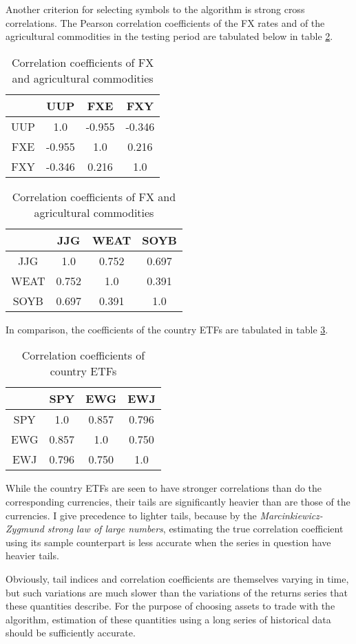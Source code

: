 \documentclass[12pt]{article}
\begin{document}
Another criterion for selecting symbols to the algorithm is strong
cross correlations. The Pearson correlation coefficients of the
FX rates and of the agricultural commodities in the testing period are
tabulated below in table \ref{tab:cor1}.
\begin{table}[htb!]
  \begin{minipage}[t]{0.5\linewidth}
    \centering
    \begin{tabular}{c|c|c|c}
      & UUP & FXE & FXY \\
      \hline
      UUP & 1.0 & -0.955 & -0.346 \\
      FXE & -0.955 & 1.0 & 0.216 \\
      FXY & -0.346 & 0.216 & 1.0
    \end{tabular}
  \end{minipage}\hfill
  \begin{minipage}[t]{0.5\linewidth}
    \centering
    \begin{tabular}{c|c|c|c}
      & JJG & WEAT & SOYB \\
      \hline
      JJG & 1.0 & 0.752 & 0.697 \\
      WEAT & 0.752 & 1.0 & 0.391 \\
      SOYB & 0.697 & 0.391 & 1.0
    \end{tabular}
  \end{minipage}
  \caption{Correlation coefficients of FX and agricultural commodities}
  \label{tab:cor1}
\end{table}
In comparison, the coefficients of the country ETFs are tabulated in
table \ref{tab:cor2}.
\begin{table}[htb!]
  \centering
  \begin{tabular}{c|c|c|c}
    & SPY & EWG & EWJ \\
    \hline
    SPY & 1.0 & 0.857 & 0.796 \\
    EWG & 0.857 & 1.0 & 0.750 \\
    EWJ & 0.796 & 0.750 & 1.0
  \end{tabular}
  \caption{Correlation coefficients of country ETFs}
  \label{tab:cor2}
\end{table}
While the country ETFs are seen to have stronger correlations than do
the corresponding currencies, their tails are significantly heavier
than are those of the currencies. I give precedence to lighter tails,
because by the {\it Marcinkiewicz-Zygmund strong law of large
  numbers}, estimating the true correlation coefficient using its
sample counterpart is less accurate when the series in question have
heavier tails.

Obviously, tail indices and correlation coefficients are themselves
varying in time, but such variations are much slower than the
variations of the returns series that these quantities describe. For
the purpose of choosing assets to trade with the algorithm, estimation
of these quantities using a long series of historical data should be
sufficiently accurate.



\end{document}

